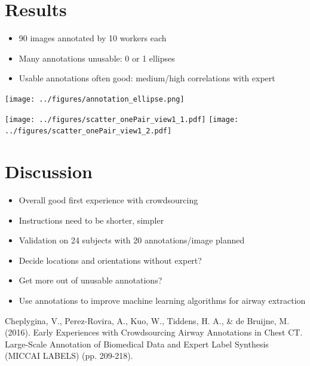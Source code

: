 \documentclass[a4paper,11pt]{article}
\begin{document}
\begin{slidetop}
\begin{multicols}{2}
\section*{Results}

\begin{itemize}
\item 90 images annotated by 10 workers each
\item Many annotations unusable: 0 or 1 ellipses
\item Usable annotations often good: medium/high correlations with expert
\end{itemize}

\begin{center}
\texttt{[image: ../figures/annotation\_ellipse.png]}
\label{fig:airway2}
\end{center}


\begin{center}
\texttt{[image: ../figures/scatter\_onePair\_view1\_1.pdf]}
\texttt{[image: ../figures/scatter\_onePair\_view1\_2.pdf]}
\label{fig:individual}
\end{center}

\vspace{0.25cm}

\section*{Discussion}

\begin{itemize}
\item Overall good first experience with crowdsourcing
\item Instructions need to be shorter, simpler
\item Validation on 24 subjects with 20 annotations/image planned
\item Decide locations and orientations without expert?
\item Get more out of unusable annotations?
\item Use annotations to improve machine learning algorithms for airway extraction
\end{itemize}

\footnotesize
Cheplygina, V., Perez-Rovira, A., Kuo, W., Tiddens, H. A., \& de Bruijne, M. (2016). Early Experiences with Crowdsourcing Airway Annotations in Chest CT. Large-Scale Annotation of Biomedical Data and Expert Label Synthesis (MICCAI LABELS) (pp. 209-218).








\end{multicols}
\end{slidetop}
\end{document}
